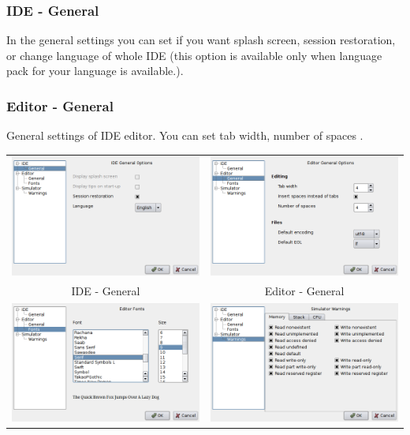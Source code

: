     \subsubsection{IDE - General}
        In the general settings you can set if you want splash screen, session restoration, or change language of whole
        IDE (this option is available only when language pack for your language is available.).

    \subsubsection{Editor - General}
        General settings of IDE editor. You can set tab width, number of spaces .

        \begin{table}[h!]
            \begin{tabular}{cc}
                \includegraphics[width=.4\textwidth]{img/interface1.png}
                    &
                \includegraphics[width=.4\textwidth]{img/interface2.png}
                    \\
                IDE - General & Editor - General
                    \\
                \includegraphics[width=.4\textwidth]{img/interface3.png}
                    &
                \includegraphics[width=.4\textwidth]{img/interface4.png}

\end{tabular}
\end{table}
